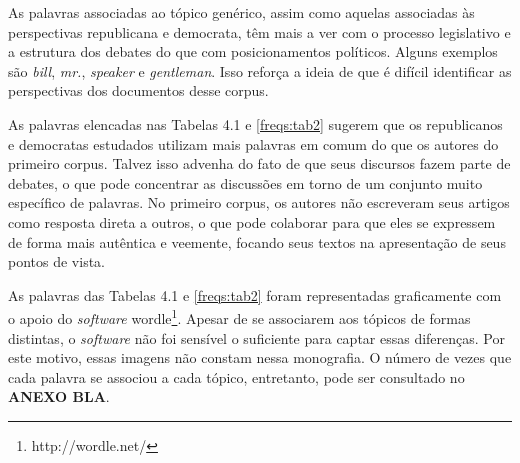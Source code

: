 As palavras associadas ao tópico genérico, assim como aquelas associadas às perspectivas republicana e democrata, têm mais a ver com o processo legislativo e a estrutura dos debates do que com posicionamentos políticos. Alguns exemplos são \emph{bill}, \emph{mr.}, \emph{speaker} e \emph{gentleman}. Isso reforça a ideia de que é difícil identificar as perspectivas dos documentos desse corpus. %

As palavras elencadas nas Tabelas 4.1 e \ref{freqs:tab2} sugerem que os republicanos e democratas estudados utilizam mais palavras em comum do que os autores do primeiro corpus. Talvez isso advenha do fato de que seus discursos fazem parte de debates, o que pode concentrar as discussões em torno de um conjunto muito específico de palavras. No primeiro corpus, os autores não escreveram seus artigos como resposta direta a outros, o que pode colaborar para que eles se expressem de forma mais autêntica e veemente, focando seus textos na apresentação de seus pontos de vista.

As palavras das Tabelas 4.1 e \ref{freqs:tab2} foram representadas graficamente com o apoio do \emph{software} wordle\footnote{http://wordle.net/}. Apesar de se associarem aos tópicos de formas distintas, o \emph{software} não foi sensível o suficiente para captar essas diferenças. Por este motivo, essas imagens não constam nessa monografia. O número de vezes que cada palavra se associou a cada tópico, entretanto, pode ser consultado no \textbf{ANEXO BLA}. %



